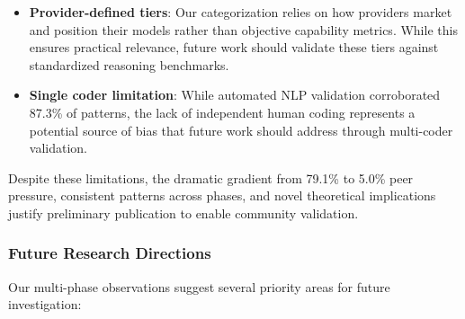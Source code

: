 \documentclass[11pt,letterpaper]{article}
\newcommand{\exponedataPeerPressurePercentage}{79.1\%}
\newcommand{\expthreePeerPressurePercentage}{5.0\%}
\begin{document}
\begin{itemize}
    \item \textbf{Provider-defined tiers}: Our categorization relies on how providers market and position their models rather than objective capability metrics. While this ensures practical relevance, future work should validate these tiers against standardized reasoning benchmarks.

    \item \textbf{Single coder limitation}: While automated NLP validation corroborated 87.3\% of patterns, the lack of independent human coding represents a potential source of bias that future work should address through multi-coder validation.

\end{itemize}

Despite these limitations, the dramatic gradient from \exponedataPeerPressurePercentage{} to \expthreePeerPressurePercentage{} peer pressure, consistent patterns across phases, and novel theoretical implications justify preliminary publication to enable community validation.

\subsubsection{Future Research Directions}

Our multi-phase observations suggest several priority areas for future investigation:
\end{document}
